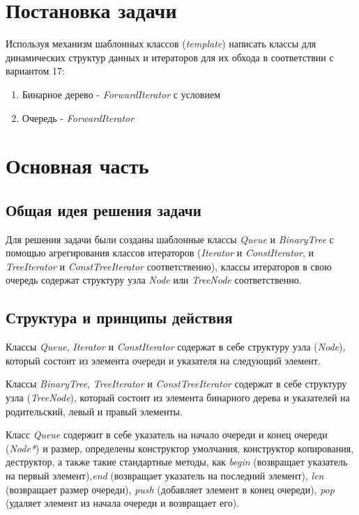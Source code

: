 \documentclass[a4paper,14pt]{article}
\begin{document}

\setcounter{page}{2} %

\renewcommand\contentsname{\centering {\normalsize Содержание}}
\tableofcontents
\newpage

\section*{Постановка задачи}

Используя механизм шаблонных классов (\textit{template}) написать классы для динамических структур данных и итераторов для их обхода в соответствии с вариантом 17:
\begin{enumerate}
	\item Бинарное дерево - \textit{ForwardIterator} с условием
	\item Очередь - \textit{ForwardIterator}
\end{enumerate}

\newpage

\section{Основная часть}
\subsection{Общая идея решения задачи}
Для решения задачи были созданы шаблонные классы \textit{Queue} и \textit{BinaryTree} с помощью агрегирования классов итераторов (\textit{Iterator} и \textit{ConstIterator}, и \textit{TreeIterator} и \textit{ConstTreeIterator} соответственно), классы итераторов в свою очередь содержат структуру узла \textit{Node} или \textit{TreeNode} соответственно.
\subsection{Структура и принципы действия}
Классы \textit{Queue}, \textit{Iterator} и \textit{ConstIterator} содержат в себе структуру узла (\textit{Node}), который состоит из элемента очереди и указателя на следующий элемент. 

Классы \textit{BinaryTree}, \textit{TreeIterator} и \textit{ConstTreeIterator} содержат в себе структуру узла (\textit{TreeNode}), который состоит из элемента бинарного дерева и указателей на родительский, левый и правый элементы. 

Класс \textit{Queue} содержит в себе указатель на начало очереди и конец очереди (\textit{Node*}) и размер, определены конструктор умолчания, конструктор копирования, деструктор, а также такие стандартные методы, как \textit{begin} (возвращает указатель на первый элемент),\textit{end} (возвращает указатель на последний элемент), \textit{len} (возвращает размер очереди), \textit{push} (добавляет элемент в конец очереди), \textit{pop} (удаляет элемент из начала очереди и возвращает его).
\end{document}
